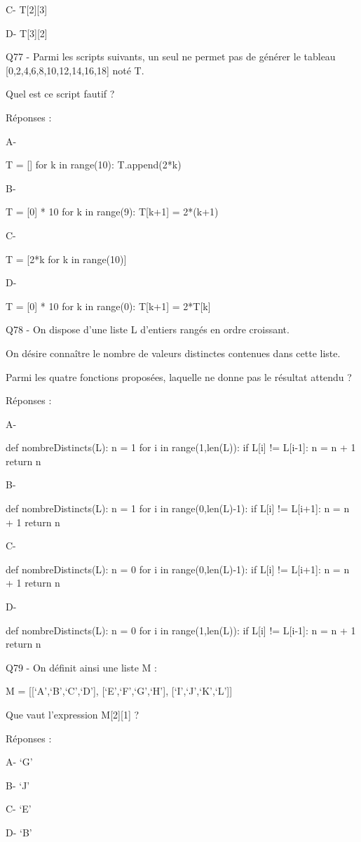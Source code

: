 \documentclass[
]{book}
\begin{document}
C- T{[}2{]}{[}3{]}

D- T{[}3{]}{[}2{]}

Q77 - Parmi les scripts suivants, un seul ne permet pas de générer le tableau {[}0,2,4,6,8,10,12,14,16,18{]} noté T.

Quel est ce script fautif ?

Réponses :

A-

T = {[}{]}
for k in range(10):
T.append(2*k)

B-

T = {[}0{]} * 10
for k in range(9):
T{[}k+1{]} = 2*(k+1)

C-

T = {[}2*k for k in range(10){]}

D-

T = {[}0{]} * 10
for k in range(0):
T{[}k+1{]} = 2*T{[}k{]}

Q78 - On dispose d'une liste L d'entiers rangés en ordre croissant.

On désire connaître le nombre de valeurs distinctes contenues dans cette liste.

Parmi les quatre fonctions proposées, laquelle ne donne pas le résultat attendu ?

Réponses :

A-

def nombreDistincts(L):
n = 1
for i in range(1,len(L)):
if L{[}i{]} != L{[}i-1{]}:
n = n + 1
return n

B-

def nombreDistincts(L):
n = 1
for i in range(0,len(L)-1):
if L{[}i{]} != L{[}i+1{]}:
n = n + 1
return n

C-

def nombreDistincts(L):
n = 0
for i in range(0,len(L)-1):
if L{[}i{]} != L{[}i+1{]}:
n = n + 1
return n

D-

def nombreDistincts(L):
n = 0
for i in range(1,len(L)):
if L{[}i{]} != L{[}i-1{]}:
n = n + 1
return n

Q79 - On définit ainsi une liste M :

M = {[}{[}`A',`B',`C',`D'{]}, {[}`E',`F',`G',`H'{]}, {[}`I',`J',`K',`L'{]}{]}

Que vaut l'expression M{[}2{]}{[}1{]} ?

Réponses :

A- `G'

B- `J'

C- `E'

D- `B'
\end{document}
